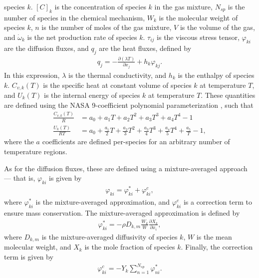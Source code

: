 species $k$. $[C]_{k}$ is the concentration of species $k$ in the gas mixture, $N_{sp}$ is the number of species
in the chemical mechanism, $W_{k}$ is the molecular weight of species $k$, $n$ is the number of moles of the gas
mixture, $V$ is the volume of the gas, and $\dot{\omega}_{k}$ is the net production rate of species $k$. $\tau_{ij}$
is the viscous stress tensor, $\varphi_{ki}$ are the diffusion fluxes, and $q_{j}$ are the heat fluxes, defined by
\begin{align}
q_{j} = - \frac{\partial (\lambda T)}{\partial x_{j}} + h_{k}\varphi_{kj}.
\end{align}
In this expression, $\lambda$ is the thermal conductivity, and $h_{k}$ is the enthalpy of species $k$.
$C_{v,k}(T)$ is the specific heat at constant volume of species $k$ at temperature $T$, and $U_{k}(T)$ is
the internal energy of species $k$ at temperature $T$. These quantities
are defined using the NASA 9-coefficient polynomial parameterization \cite{mcbride2002nasa}, such that
\begin{align}
\frac{C_{v,k}(T)}{R} &= a_{0} + a_{1}T + a_{2}T^{2} + a_{3}T^{3} + a_{4}T^{4} - 1 \\
\frac{U_{k}(T)}{RT} &= a_{0} + \frac{a_{1}}{2}T + \frac{a_{2}}{3}T^{2} + \frac{a_{3}}{4}T^{3} + \frac{a_{4}}{5}T^{4} + \frac{a_{5}}{T} - 1,
\end{align}
where the $a$ coefficients are defined per-species for an arbitrary number of temperature regions.

As for the diffusion fluxes, these are defined using a mixture-averaged approach --- that is, $\varphi_{ki}$
is given by
\begin{align}
\varphi_{ki} = \varphi_{ki}^{*} + \varphi_{ki}^{c},
\end{align}
where $\varphi_{ki}^{*}$ is the mixture-averaged approximation, and $\varphi_{ki}^{c}$
is a correction term to ensure mass conservation. The mixture-averaged approximation
is defined by
\begin{align}
\varphi_{ki}^{*} = -\rho D_{k,m}\frac{W_{k}}{W} \frac{\partial X_{k}}{\partial x_{i}},
\end{align}
where $D_{k,m}$ is the mixture-averaged diffusivity of species $k$, $W$ is the mean
molecular weight, and $X_{k}$ is the mole fraction of species $k$. Finally, the
correction term is given by
\begin{align}
\varphi_{ki}^{c} = -Y_{k} \sum_{n=1}^{N_{sp}} \varphi_{ni}^{*}.
\end{align}


